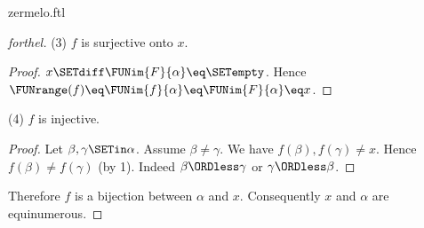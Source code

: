 \documentclass{naproche-library}
\begin{document}
\begin{smodule}[title=Zermelo's Well-Ordering Theorem]{zermelo.ftl}
\begin{proof}[forthel]
  (3) $f$ is surjective onto $x$.
  \begin{proof}
    $x \SETdiff \FUNim{F}{\alpha} \eq \SETempty$.
    Hence $\FUNrange(f)
      \eq \FUNim{f}{\alpha}
      \eq \FUNim{F}{\alpha}
      \eq x$.
  \end{proof}

  (4) $f$ is injective.
  \begin{proof}
    Let $\beta, \gamma \SETin \alpha$.
    Assume $\beta \neq \gamma$.
    We have $f(\beta), f(\gamma) \neq x$.
    Hence $f(\beta) \neq f(\gamma)$ (by 1).
    Indeed $\beta \ORDless \gamma$ or $\gamma \ORDless \beta$.
  \end{proof}

  Therefore $f$ is a bijection between $\alpha$ and $x$.
  Consequently $x$ and $\alpha$ are equinumerous.
\end{proof}
\end{smodule}
\end{document}
